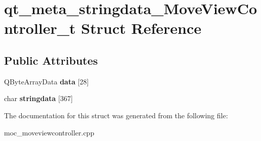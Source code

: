 \hypertarget{structqt__meta__stringdata__MoveViewController__t}{\section{qt\-\_\-meta\-\_\-stringdata\-\_\-\-Move\-View\-Controller\-\_\-t Struct Reference}
\label{structqt__meta__stringdata__MoveViewController__t}
}
\subsection*{Public Attributes}
\begin{DoxyCompactItemize}
\item 
\hypertarget{structqt__meta__stringdata__MoveViewController__t_adad5a6a975d95218ce73e83d97d64030}{Q\-Byte\-Array\-Data {\bfseries data} \mbox{[}28\mbox{]}}\label{structqt__meta__stringdata__MoveViewController__t_adad5a6a975d95218ce73e83d97d64030}

\item 
\hypertarget{structqt__meta__stringdata__MoveViewController__t_a2c33f706f1547997925a8f9ad9a40da7}{char {\bfseries stringdata} \mbox{[}367\mbox{]}}\label{structqt__meta__stringdata__MoveViewController__t_a2c33f706f1547997925a8f9ad9a40da7}

\end{DoxyCompactItemize}


The documentation for this struct was generated from the following file\-:\begin{DoxyCompactItemize}
\item 
moc\-\_\-moveviewcontroller.\-cpp\end{DoxyCompactItemize}
